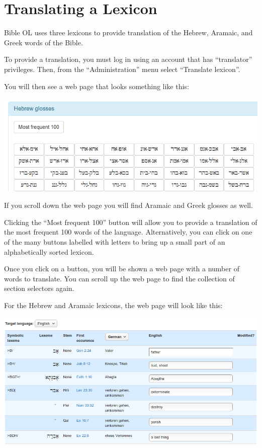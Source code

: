\documentclass[11pt,oneside,a4paper]{memoir}
\begin{document}
\chapter{Translating a Lexicon}

Bible OL uses three lexicons to provide translation of the Hebrew, Aramaic, and Greek words of the
Bible.

To provide a translation, you must log in using an account that has ``translator'' privileges. Then,
from the ``Administration'' menu select ``Translate lexicon''.

You will then see a web page that looks something like this:

\begin{center}
  \includegraphics[width=0.9\linewidth]{lexicon.png}
\end{center}

If you scroll down the web page you will find Aramaic and Greek glosses as well.

Clicking the ``Most frequent 100'' button will allow you to provide a translation of the most
frequent 100 words of the language. Alternatively, you can click on one of the many buttons labelled
with letters to bring up a small part of an alphabetically sorted lexicon.

Once you click on a button, you will be shown a web page with a number of words to translate. You
can scroll up the web page to find the collection of section selectors again.

For the Hebrew and Aramaic lexicons, the web page will look like this:

\begin{center}
  \includegraphics[width=0.9\linewidth]{lexiconHeb.png}
\end{center}
\end{document}
